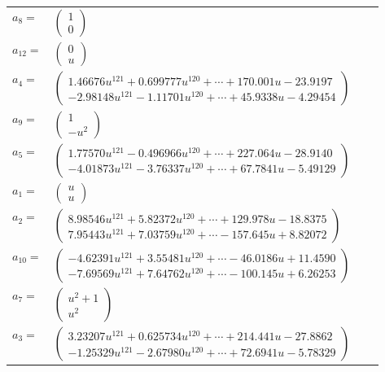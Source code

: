 \documentclass[1p]{elsarticle_modified}
\theoremstyle{definition}
\begin{document}
\begin{tabular}{m{7pt} m{180pt} m{7pt} m{180pt} }
\flushright $a_{8}=$&$\begin{pmatrix}1\\0\end{pmatrix}$ \\
\flushright $a_{12}=$&$\begin{pmatrix}0\\u\end{pmatrix}$ \\
\flushright $a_{4}=$&$\begin{pmatrix}1.46676 u^{121}+0.699777 u^{120}+\cdots+170.001 u-23.9197\\-2.98148 u^{121}-1.11701 u^{120}+\cdots+45.9338 u-4.29454\end{pmatrix}$ \\
\flushright $a_{9}=$&$\begin{pmatrix}1\\- u^2\end{pmatrix}$ \\
\flushright $a_{5}=$&$\begin{pmatrix}1.77570 u^{121}-0.496966 u^{120}+\cdots+227.064 u-28.9140\\-4.01873 u^{121}-3.76337 u^{120}+\cdots+67.7841 u-5.49129\end{pmatrix}$ \\
\flushright $a_{1}=$&$\begin{pmatrix}u\\u\end{pmatrix}$ \\
\flushright $a_{2}=$&$\begin{pmatrix}8.98546 u^{121}+5.82372 u^{120}+\cdots+129.978 u-18.8375\\7.95443 u^{121}+7.03759 u^{120}+\cdots-157.645 u+8.82072\end{pmatrix}$ \\
\flushright $a_{10}=$&$\begin{pmatrix}-4.62391 u^{121}+3.55481 u^{120}+\cdots-46.0186 u+11.4590\\-7.69569 u^{121}+7.64762 u^{120}+\cdots-100.145 u+6.26253\end{pmatrix}$ \\
\flushright $a_{7}=$&$\begin{pmatrix}u^2+1\\u^2\end{pmatrix}$ \\
\flushright $a_{3}=$&$\begin{pmatrix}3.23207 u^{121}+0.625734 u^{120}+\cdots+214.441 u-27.8862\\-1.25329 u^{121}-2.67980 u^{120}+\cdots+72.6941 u-5.78329\end{pmatrix}$ \\

\end{tabular}
\end{document}
